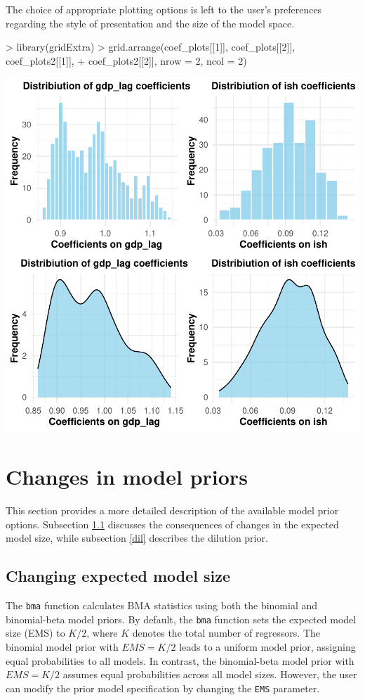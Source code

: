 \documentclass[a4paper]{article}
\begin{document}
The choice of appropriate plotting options is left to the user's preferences regarding the style of presentation and the size of the model space.
\begin{Schunk}
\begin{Sinput}
> library(gridExtra)
> grid.arrange(coef_plots[[1]], coef_plots[[2]], coef_plots2[[1]],
+              coef_plots2[[2]], nrow = 2, ncol = 2)
\end{Sinput}
\end{Schunk}
\includegraphics{bdsm_vignette-025}

\section{Changes in model priors}\label{priors}

This section provides a more detailed description of the available model prior options.
Subsection \ref{ems} discusses the consequences of changes in the expected model size, while subsection \ref{dil} describes the dilution prior.

\subsection{Changing expected model size}\label{ems}

The \verb+bma+ function calculates BMA statistics using both the binomial and binomial-beta model priors.
By default, the \verb+bma+ function sets the expected model size (EMS) to $K/2$, where $K$ denotes the total number of regressors.
The binomial model prior with $EMS = K/2$ leads to a uniform model prior, assigning equal probabilities to all models.
In contrast, the binomial-beta model prior with $EMS = K/2$ assumes equal probabilities across all model sizes.
However, the user can modify the prior model specification by changing the \verb+EMS+ parameter.
\end{document}
